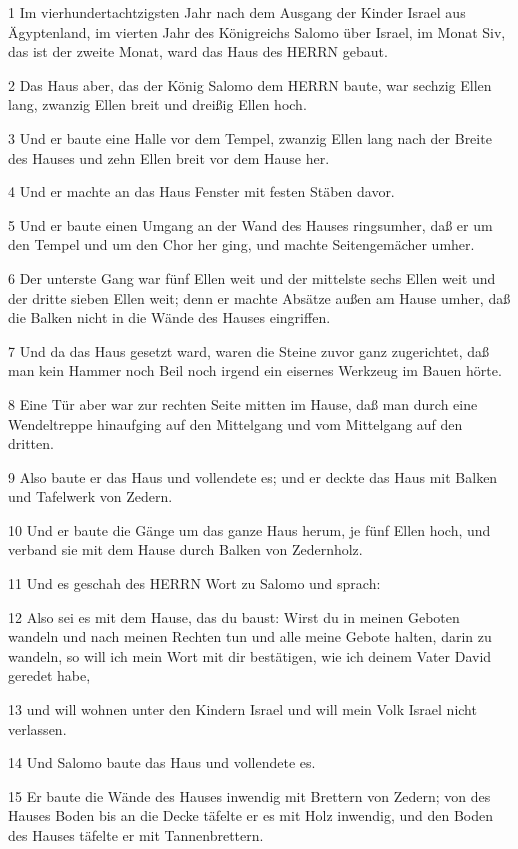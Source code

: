 \par 1 Im vierhundertachtzigsten Jahr nach dem Ausgang der Kinder Israel aus Ägyptenland, im vierten Jahr des Königreichs Salomo über Israel, im Monat Siv, das ist der zweite Monat, ward das Haus des HERRN gebaut.
\par 2 Das Haus aber, das der König Salomo dem HERRN baute, war sechzig Ellen lang, zwanzig Ellen breit und dreißig Ellen hoch.
\par 3 Und er baute eine Halle vor dem Tempel, zwanzig Ellen lang nach der Breite des Hauses und zehn Ellen breit vor dem Hause her.
\par 4 Und er machte an das Haus Fenster mit festen Stäben davor.
\par 5 Und er baute einen Umgang an der Wand des Hauses ringsumher, daß er um den Tempel und um den Chor her ging, und machte Seitengemächer umher.
\par 6 Der unterste Gang war fünf Ellen weit und der mittelste sechs Ellen weit und der dritte sieben Ellen weit; denn er machte Absätze außen am Hause umher, daß die Balken nicht in die Wände des Hauses eingriffen.
\par 7 Und da das Haus gesetzt ward, waren die Steine zuvor ganz zugerichtet, daß man kein Hammer noch Beil noch irgend ein eisernes Werkzeug im Bauen hörte.
\par 8 Eine Tür aber war zur rechten Seite mitten im Hause, daß man durch eine Wendeltreppe hinaufging auf den Mittelgang und vom Mittelgang auf den dritten.
\par 9 Also baute er das Haus und vollendete es; und er deckte das Haus mit Balken und Tafelwerk von Zedern.
\par 10 Und er baute die Gänge um das ganze Haus herum, je fünf Ellen hoch, und verband sie mit dem Hause durch Balken von Zedernholz.
\par 11 Und es geschah des HERRN Wort zu Salomo und sprach:
\par 12 Also sei es mit dem Hause, das du baust: Wirst du in meinen Geboten wandeln und nach meinen Rechten tun und alle meine Gebote halten, darin zu wandeln, so will ich mein Wort mit dir bestätigen, wie ich deinem Vater David geredet habe,
\par 13 und will wohnen unter den Kindern Israel und will mein Volk Israel nicht verlassen.
\par 14 Und Salomo baute das Haus und vollendete es.
\par 15 Er baute die Wände des Hauses inwendig mit Brettern von Zedern; von des Hauses Boden bis an die Decke täfelte er es mit Holz inwendig, und den Boden des Hauses täfelte er mit Tannenbrettern.
